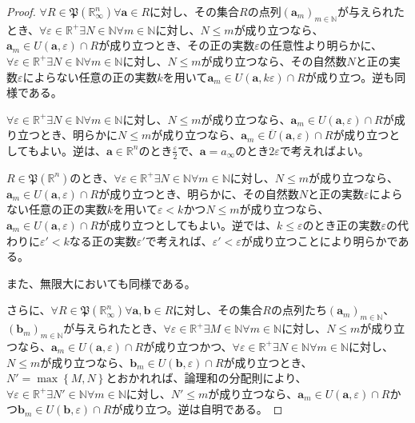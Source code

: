 \documentclass[dvipdfmx]{jsarticle}
\begin{document}
\begin{proof}
$\forall R \in \mathfrak{P}\left( \mathbb{R}_{\infty}^{n} \right)\forall\mathbf{a} \in R$に対し、その集合$R$の点列$\left( \mathbf{a}_{m} \right)_{m \in \mathbb{N}}$が与えられたとき、$\forall\varepsilon \in \mathbb{R}^{+}\exists N \in \mathbb{N}\forall m \in \mathbb{N}$に対し、$N \leq m$が成り立つなら、$\mathbf{a}_{m} \in U\left( \mathbf{a},\varepsilon \right) \cap R$が成り立つとき、その正の実数$\varepsilon$の任意性より明らかに、$\forall\varepsilon \in \mathbb{R}^{+}\exists N \in \mathbb{N}\forall m \in \mathbb{N}$に対し、$N \leq m$が成り立つなら、その自然数$N$と正の実数$\varepsilon$によらない任意の正の実数$k$を用いて$\mathbf{a}_{m} \in U\left( \mathbf{a},k\varepsilon \right) \cap R$が成り立つ。逆も同様である。\par
$\forall\varepsilon \in \mathbb{R}^{+}\exists N \in \mathbb{N}\forall m \in \mathbb{N}$に対し、$N \leq m$が成り立つなら、$\mathbf{a}_{m} \in U\left( \mathbf{a},\varepsilon \right) \cap R$が成り立つとき、明らかに$N \leq m$が成り立つなら、$\mathbf{a}_{m} \in \overline{U}\left( \mathbf{a},\varepsilon \right) \cap R$が成り立つとしてもよい。逆は、$\mathbf{a} \in \mathbb{R}^{n}$のとき$\frac{\varepsilon}{2}$で、$\mathbf{a} = a_{\infty}$のとき$2\varepsilon$で考えればよい。\par
$R \in \mathfrak{P}\left( \mathbb{R}^{n} \right)$のとき、$\forall\varepsilon \in \mathbb{R}^{+}\exists N \in \mathbb{N}\forall m \in \mathbb{N}$に対し、$N \leq m$が成り立つなら、$\mathbf{a}_{m} \in U\left( \mathbf{a},\varepsilon \right) \cap R$が成り立つとき、明らかに、その自然数$N$と正の実数$\varepsilon$によらない任意の正の実数$k$を用いて$\varepsilon < k$かつ$N \leq m$が成り立つなら、$\mathbf{a}_{m} \in U\left( \mathbf{a},\varepsilon \right) \cap R$が成り立つとしてもよい。逆では、$k \leq \varepsilon$のとき正の実数$\varepsilon$の代わりに$\varepsilon' < k$なる正の実数$\varepsilon'$で考えれば、$\varepsilon' < \varepsilon$が成り立つことにより明らかである。\par
また、無限大においても同様である。\par
さらに、$\forall R \in \mathfrak{P}\left( \mathbb{R}_{\infty}^{n} \right)\forall\mathbf{a},\mathbf{b} \in R$に対し、その集合$R$の点列たち$\left( \mathbf{a}_{m} \right)_{m \in \mathbb{N}}$、$\left( \mathbf{b}_{m} \right)_{m \in \mathbb{N}}$が与えられたとき、$\forall\varepsilon \in \mathbb{R}^{+}\exists M \in \mathbb{N}\forall m \in \mathbb{N}$に対し、$N \leq m$が成り立つなら、$\mathbf{a}_{m} \in U\left( \mathbf{a},\varepsilon \right) \cap R$が成り立つかつ、$\forall\varepsilon \in \mathbb{R}^{+}\exists N \in \mathbb{N}\forall m \in \mathbb{N}$に対し、$N \leq m$が成り立つなら、$\mathbf{b}_{m} \in U\left( \mathbf{b},\varepsilon \right) \cap R$が成り立つとき、$N' = \max\left\{ M,N \right\}$とおかれれば、論理和の分配則により、$\forall\varepsilon \in \mathbb{R}^{+}\exists N' \in \mathbb{N}\forall m \in \mathbb{N}$に対し、$N' \leq m$が成り立つなら、$\mathbf{a}_{m} \in U\left( \mathbf{a},\varepsilon \right) \cap R$かつ$\mathbf{b}_{m} \in U\left( \mathbf{b},\varepsilon \right) \cap R$が成り立つ。逆は自明である。
\end{proof}
\end{document}

